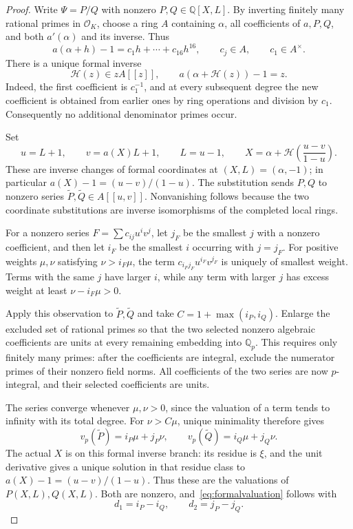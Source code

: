 \documentclass[11pt,a4paper]{article}
\theoremstyle{remark}\newtheorem{remark}[theorem]{Remark}
\newcommand{\Q}{\mathbb Q}\newcommand{\Z}{\mathbb Z}
\begin{document}
\begin{proof}
Write \(\Psi=P/Q\) with nonzero \(P,Q\in\Q[X,L]\).
By inverting finitely many rational primes in \(\mathcal O_K\),
choose a ring \(A\) containing \(\alpha\), all coefficients
of \(a,P,Q\), and both \(a'(\alpha)\) and its inverse.
Thus
\[
 a(\alpha+h)-1=c_1h+\cdots+c_{16}h^{16},
 \qquad c_j\in A,\qquad c_1\in A^\times .
\]
There is a unique formal inverse
\[
 \mathcal H(z)\in zA[[z]],\qquad
          a(\alpha+\mathcal H(z))-1=z.
\]
Indeed, the first coefficient is \(c_1^{-1}\), and at every
subsequent degree the new coefficient is obtained from earlier
ones by ring operations and division by \(c_1\). Consequently
no additional denominator primes occur.

Set
\begin{equation}\label{eq:localcoordinates}
 u=L+1,\qquad v=a(X)L+1,\qquad
 L=u-1,\qquad
 X=\alpha+\mathcal H\!\left(\frac{u-v}{1-u}\right).
\end{equation}
These are inverse changes of formal coordinates at
\((X,L)=(\alpha,-1)\); in particular
\(a(X)-1=(u-v)/(1-u)\).
The substitution sends \(P,Q\) to nonzero series
\(\widetilde P,\widetilde Q\in A[[u,v]]\).
Nonvanishing follows because the two coordinate substitutions
are inverse isomorphisms of the completed local rings.

For a nonzero series \(F=\sum c_{ij}u^iv^j\), let \(j_F\)
be the smallest \(j\) with a nonzero coefficient, and then let
\(i_F\) be the smallest \(i\) occurring with \(j=j_F\).
For positive weights \(\mu,\nu\) satisfying \(\nu>i_F\mu\),
the term \(c_{i_Fj_F}u^{i_F}v^{j_F}\) is uniquely of smallest
weight. Terms with the same \(j\) have larger \(i\), while
any term with larger \(j\) has excess weight at least
\(\nu-i_F\mu>0\).

Apply this observation to \(\widetilde P,\widetilde Q\) and
take \(C=1+\max(i_P,i_Q)\). Enlarge the excluded set of rational
primes so that the two selected nonzero algebraic coefficients
are units at every remaining embedding into \(\Q_p\).
This requires only finitely many primes: after the coefficients
are integral, exclude the numerator primes of their nonzero
field norms. All coefficients of the two series are now
\(p\)-integral, and their selected coefficients are units.

The series converge whenever \(\mu,\nu>0\), since the valuation
of a term tends to infinity with its total degree.
For \(\nu>C\mu\), unique minimality therefore gives
\[
        v_p(\widetilde P)=i_P\mu+j_P\nu,\qquad
        v_p(\widetilde Q)=i_Q\mu+j_Q\nu.
\]
The actual \(X\) is on this formal inverse branch: its residue
is \(\xi\), and the unit derivative gives a unique solution
in that residue class to
\(a(X)-1=(u-v)/(1-u)\).
Thus these are the valuations of \(P(X,L),Q(X,L)\).
Both are nonzero, and~\eqref{eq:formalvaluation} follows with
\[
                     d_1=i_P-i_Q,\qquad d_2=j_P-j_Q.
\]
\end{proof}
\end{document}
